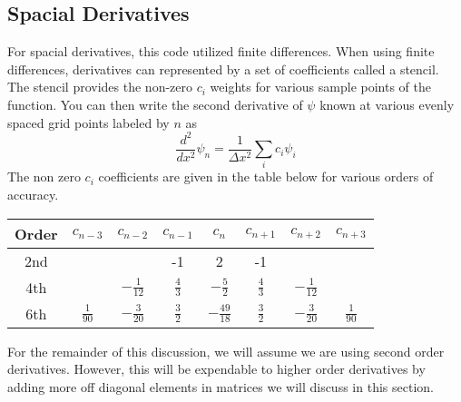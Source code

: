 \documentclass{article}
\begin{document}
\subsection{Spacial Derivatives} %
\label{sub:spacial_derivatives}
For spacial derivatives, this code utilized finite differences. When using finite differences, derivatives can represented by a set of coefficients called a stencil. The stencil provides the non-zero $c_i$ weights for various sample points of the function. You can then write the second derivative of $\psi$ known at various evenly spaced grid points labeled by $n$ as
\begin{equation}
    \frac{d^2}{dx^2}\psi_n = \frac{1}{\Delta x^2}\sum_i c_i \psi_i
    \label{eq:finite_diff}
\end{equation}
The non zero $c_i$ coefficients are given in the table below for various orders of accuracy.
\begin{center}
\begin{tabular}{ |c|c|c|c|c|c|c|c| }
\hline
Order & $c_{n-3}$ & $c_{n-2}$ & $c_{n-1}$ & $c_{n}$ & $c_{n+1}$ & $c_{n+2}$ & $c_{n+3}$ \\ \hline
2nd   &      &      & -1   & 2  & -1   &      &      \\ \hline
4th   &      & $-\frac{1}{12}$ & $\frac{4}{3}$   & $-\frac{5}{2}$  & $\frac{4}{3}$   &  $-\frac{1}{12}$    &      \\ \hline
6th   &   $\frac{1}{90}$   &  $-\frac{3}{20}$    & $\frac{3}{2}$   & $-\frac{49}{18}$  & $\frac{3}{2}$   &   $-\frac{3}{20}$    &   $\frac{1}{90}$  \\ \hline
\end{tabular}
\end{center}

For the remainder of this discussion, we will assume we are using second order derivatives. However, this will be expendable to higher order derivatives by adding more off diagonal elements in matrices we will discuss in this section.
\end{document}
